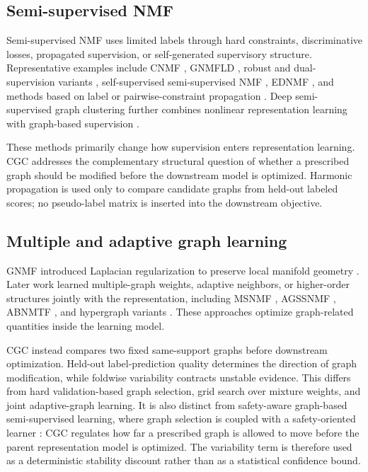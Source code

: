 \documentclass[11pt]{article}
\theoremstyle{remark}
\begin{document}
\subsection{Semi-supervised NMF}

Semi-supervised NMF uses limited labels through hard constraints, discriminative losses, propagated supervision, or self-generated supervisory structure. Representative examples include CNMF \cite{Liu2012CNMF}, GNMFLD \cite{Xing2021GNMFLD}, robust and dual-supervision variants \cite{Peng2021RSNMF,Peng2022DCNMF}, self-supervised semi-supervised NMF \cite{Chavoshinejad2023S4NMF}, EDNMF \cite{Li2025EDNMF}, and methods based on label or pairwise-constraint propagation \cite{Mo2024PNLPSCNMF,Jing2026SNMFWLP,Yang2025SPNMF}. Deep semi-supervised graph clustering further combines nonlinear representation learning with graph-based supervision \cite{Qi2024GSSC}.

These methods primarily change how supervision enters representation learning. CGC addresses the complementary structural question of whether a prescribed graph should be modified before the downstream model is optimized. Harmonic propagation is used only to compare candidate graphs from held-out labeled scores; no pseudo-label matrix is inserted into the downstream objective.

\subsection{Multiple and adaptive graph learning}

GNMF introduced Laplacian regularization to preserve local manifold geometry \cite{Cai2011GNMF}. Later work learned multiple-graph weights, adaptive neighbors, or higher-order structures jointly with the representation, including MSNMF \cite{Zhang2021MSNMF}, AGSSNMF \cite{Yi2020AGSSNMF}, ABNMTF \cite{Li2023ABNMTF}, and hypergraph variants \cite{Ren2025AHSSNMF,Yin2023HSSNMF}. These approaches optimize graph-related quantities inside the learning model.

CGC instead compares two fixed same-support graphs before downstream optimization. Held-out label-prediction quality determines the direction of graph modification, while foldwise variability contracts unstable evidence. This differs from hard validation-based graph selection, grid search over mixture weights, and joint adaptive-graph learning. It is also distinct from safety-aware graph-based semi-supervised learning, where graph selection is coupled with a safety-oriented learner \cite{Gan2018SaGSSL}: CGC regulates how far a prescribed graph is allowed to move before the parent representation model is optimized. The variability term is therefore used as a deterministic stability discount rather than as a statistical confidence bound.
\end{document}

